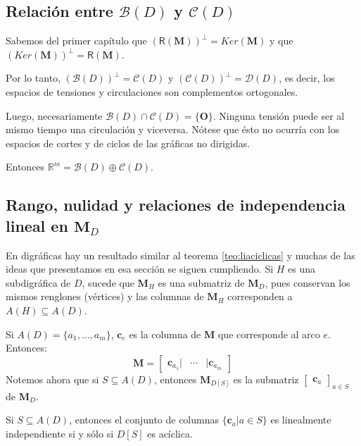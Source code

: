 \subsection{Relación entre $\mathcal{B}(D)$ y $\mathcal{C}(D)$}

Sabemos del primer capítulo que $(\mathsf{R}(\mathbf{M}))^{\perp}=Ker(\mathbf{M})$ y que $(Ker(\mathbf{M}))^{\perp} = \mathsf{R}(\mathbf{M})$.

Por lo tanto, $(\mathcal{B}(D))^{\perp} = \mathcal{C}(D)$ y $(\mathcal{C}(D))^{\perp} = \mathcal{D}(D)$, es decir, los espacios de tensiones y circulaciones son complementos ortogonales.

Luego, necesariamente $\mathcal{B}(D) \cap \mathcal{C}(D) = \{\mathbf{O}\}$. Ninguna tensión puede ser al mismo tiempo una circulación y viceversa. Nótese que ésto no ocurría con los espacios de cortes y de ciclos de las gráficas no dirigidas.  

Entonces $\mathbb{R}^{m} = \mathcal{B}(D) \oplus \mathcal{C}(D)$.

\subsection{Rango, nulidad y relaciones de independencia lineal en $\mathbf{M}_{D}$}

En digráficas hay un resultado similar al teorema \ref{teo:liaciclicas} y muchas de las ideas que presentamos en esa sección se siguen cumpliendo. Si $H$ es una subdigráfica de $D$,  sucede que $\mathbf{M}_{H}$ es una submatriz de $\mathbf{M}_{D}$, pues conservan los mismos renglones (vértices) y las columnas de $\mathbf{M}_{H}$ corresponden a $A(H)\subseteq A(D)$.

Si $A(D)=\{a_{1}, \ldots, a_{m}\}$, $\mathbf{c}_{e}$ es la columna de $\mathbf{M}$ que corresponde al arco $e$. Entonces:
$$
\mathbf{M}=\begin{bmatrix}
\mathbf{c}_{a_{1}} |& \cdots & |\mathbf{c}_{a_{m}} 
\end{bmatrix}
$$
Notemos ahora que si $S \subseteq A(D)$, entonces $\mathbf{M}_{D[S]}$ es la submatriz $\begin{bmatrix}
\mathbf{c}_{a}  
\end{bmatrix}_{a \in S}$ de $\mathbf{M}_{D}$.

\begin{teo}\label{teo:liaciclicas2} Si $S \subseteq A(D)$, entonces
el conjunto de columnas $\{\mathbf{c}_{a} | a \in S\}$ es linealmente independiente si y sólo si $D[S]$ es acíclica.
\end{teo}

